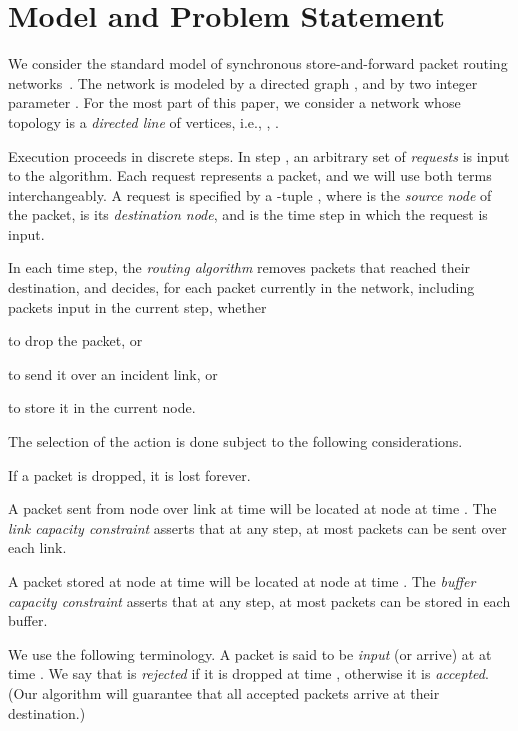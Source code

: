 \documentclass[11pt]{article}
\newenvironment{proof sketch}[1]{\noindent {\emph{Proof sketch of #1:}}}{\hfill \qed}
\begin{document}
\section{Model and Problem Statement}
\label{sec:problem}
\label{sect:problem}

We consider the standard model of synchronous store-and-forward packet
routing networks~\cite{AKOR,AKK,AZ}. The network is modeled by a
directed graph , and by two integer parameter .
For the most part of this paper, we consider a network whose topology
is  a \emph{directed line} of 
vertices, i.e.,
, .


Execution proceeds in discrete steps. In step , an arbitrary set of
\emph{requests} is input to the algorithm. Each request represents a
packet, and we will use both terms interchangeably. A request is
specified by a -tuple
, where  is the \emph{source node} of the
packet,  is its \emph{destination node}, and  is
the time step in which the request is input.

In each time step, the \emph{routing algorithm} removes packets that
reached their destination, and  decides, for each
packet currently in the network, including
packets input in the current
step, whether
\begin{inparaenum}[(i)]
\item to drop the packet, or
\item to send it over an incident link, or
\item to store it in the current node.
\end{inparaenum}
The selection of the action is done subject to the following
considerations.
\begin{compactitem}
\item If a packet is dropped, it is lost forever.
\item A packet sent from node  over link  at time  will
  be located at node  at time . The \emph{link capacity constraint} asserts that at any step,
  at most  packets can be sent over each link.
\item A packet stored at node  at time  will
  be located at node  at time . The \emph{buffer capacity
    constraint} asserts that at any step,
  at most  packets can be stored in each buffer.
\end{compactitem}
We use the following terminology.  A packet
 is said to be \emph{input} (or arrive)
at  at time . We say that  is
\emph{rejected} if it is dropped at time , otherwise
it is \emph{accepted}. (Our algorithm will guarantee that
all accepted packets arrive at their destination.)
\end{document}
